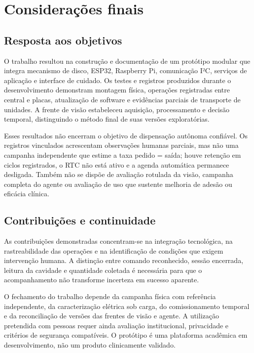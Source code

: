 \chapter{Considerações finais}\label{cap:conclusao}
\section{Resposta aos objetivos}
O trabalho resultou na construção e documentação de um protótipo modular que integra mecanismo de disco, ESP32, Raspberry Pi, comunicação I²C, serviços de aplicação e interface de cuidado. Os testes e registros produzidos durante o desenvolvimento demonstram montagem física, operações registradas entre central e placas, atualização de software e evidências parciais de transporte de unidades. A frente de visão estabeleceu aquisição, processamento e decisão temporal, distinguindo o método final de suas versões exploratórias. 

Esses resultados não encerram o objetivo de dispensação autônoma confiável. Os registros vinculados acrescentam observações humanas parciais, mas não uma campanha independente que estime a taxa pedido = saída; houve retenção em ciclos registrados, o RTC não está ativo e a agenda automática permanece desligada. Também não se dispõe de avaliação rotulada da visão, campanha completa do agente ou avaliação de uso que sustente melhoria de adesão ou eficácia clínica. 

\section{Contribuições e continuidade}
As contribuições demonstradas concentram-se na integração tecnológica, na rastreabilidade das operações e na identificação de condições que exigem intervenção humana. A distinção entre comando reconhecido, sessão encerrada, leitura da cavidade e quantidade coletada é necessária para que o acompanhamento não transforme incerteza em sucesso aparente.

O fechamento do trabalho depende da campanha física com referência independente, da caracterização elétrica sob carga, do comissionamento temporal e da reconciliação de versões das frentes de visão e agente. A utilização pretendida com pessoas requer ainda avaliação institucional, privacidade e critérios de segurança compatíveis. O protótipo é uma plataforma acadêmica em desenvolvimento, não um produto clinicamente validado.

